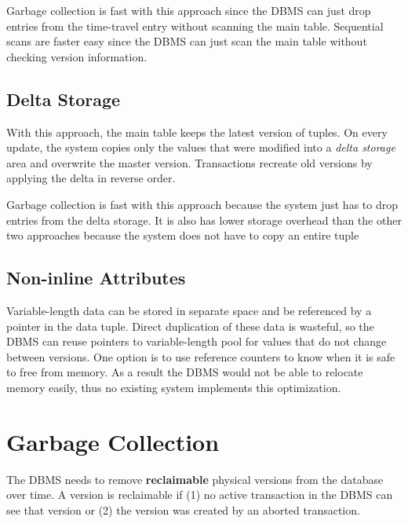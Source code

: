 \documentclass[11pt]{article}
\begin{document}
Garbage collection is fast with this approach since the DBMS can just drop entries from the 
time-travel entry without scanning the main table. Sequential scans are faster easy since the DBMS 
can just scan the main table without checking version information.

\subsection*{Delta Storage}
With this approach, the main table keeps the latest version of tuples. On every update, the 
system copies only the values that were modified into a \textit{delta storage} area and 
overwrite the master version. Transactions recreate old versions by applying the delta in reverse 
order.

Garbage collection is fast with this approach because the system just has to drop entries from 
the delta storage. It is also has lower storage overhead than the other two approaches because 
the system does not have to copy an entire tuple

\subsection*{Non-inline Attributes}
Variable-length data can be stored in separate space and be referenced by a pointer in the data 
tuple. Direct duplication of these data is wasteful, so the DBMS can reuse pointers to 
variable-length pool for values that do not change between versions. One option is to use reference 
counters to know when it is safe to free from memory. As a result the DBMS would not be able to 
relocate memory easily, thus no existing system implements this optimization.



\section{Garbage Collection}
The DBMS needs to remove \textbf{reclaimable} physical versions from the database over 
time. A version is reclaimable if (1) no active transaction in the DBMS can see that version or 
(2) the version was created by an aborted transaction.
\end{document}
